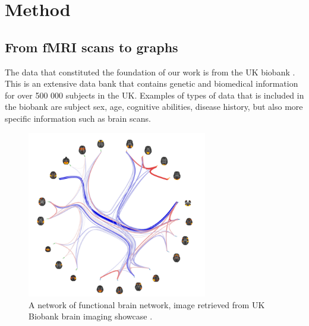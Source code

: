 \chapter{Method}

\section{From fMRI scans to graphs}\label{sec:fmri_to_graphs}
The data that constituted the foundation of our work is from the UK biobank \cite{ukbiobank}. This is an extensive data bank that contains genetic and biomedical information for over 500 000 subjects in the UK. Examples of types of data that is included in the biobank are subject sex, age, cognitive abilities, disease history, but also more specific information such as brain scans. 

\begin{figure}[H]
    \centering
    \includegraphics[width=0.7\textwidth]{chapters/images_methods/fmri_network.PNG}
    \caption{A network of functional brain network, image retrieved from UK Biobank brain imaging showcase  \cite{ukbiobank_brain_imaging}.}
    \label{fig:fmri_network}
\end{figure}

